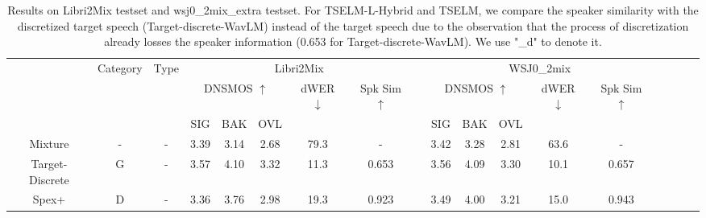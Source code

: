 \documentclass[conference]{IEEEtran}
\begin{document}
\begin{table}
  \caption{Results on Libri2Mix testset and wsj0\_2mix\_extra testset. For TSELM-L-Hybrid  
  and TSELM, we compare the speaker similarity with the discretized target speech 
  (Target-discrete-WavLM) instead of the target speech due to the observation that 
  the process of discretization already losses the speaker information (0.653 for 
  Target-discrete-WavLM). We use "\_d" to denote it. }
  \renewcommand{\arraystretch}{1.2}
  \begin{center}
  \begin{tabular}{cccccccccccccccccc}
    \Xhline{2\arrayrulewidth} %
  \multirow{3}{*}{System} & \multicolumn{1}{l}{\multirow{3}{*}{Category}} & \multicolumn{1}{l}{\multirow{3}{*}{Type}} &  \multicolumn{5}{c}{Libri2Mix}                    &                               & \multicolumn{5}{c}{WSJ0\_2mix}                                                  \\
  \cline{4-8} \cline{10-14}
                          & \multicolumn{1}{l}{}                                                 & \multicolumn{1}{l}{}                            & \multicolumn{3}{c}{DNSMOS $\uparrow$} & dWER $\downarrow$ & Spk Sim $\uparrow$ &  & \multicolumn{3}{c}{DNSMOS $\uparrow$} & dWER $\downarrow$ & Spk Sim $\uparrow$  \\ \cline{4-6} \cline{10-12}
                          & \multicolumn{1}{l}{}                                                    & \multicolumn{1}{l}{}                            & SIG         & BAK        & OVL        &                   &        &             & SIG         & BAK        & OVL        &                   &                    \\ \hline
  Mixture                 & -                                             & -                                                                                           & 3.39        & 3.14       & 2.68       & 79.3            & -        &           & 3.42        & 3.28       & 2.81       & 63.6            & -                  \\
  Target-Discrete         & G                                             & -                                                                                          & 3.57        & 4.10       & 3.32       & 11.3            & 0.653     &          & 3.56        & 4.09       & 3.30       & 10.1            & 0.657               \\ \hline
  Spex+                   & D                                             & -                                                                                  & 3.36        & 3.76       & 2.98       & 19.3            & 0.923     &          & 3.49        & 4.00       & 3.21       & 15.0            & 0.943             \\

\end{tabular}
\end{center}
\end{table}
\end{document}
